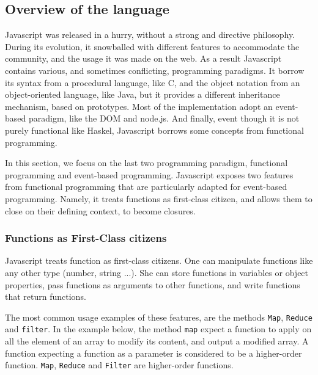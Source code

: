 \subsection{Overview of the language}

Javascript was released in a hurry, without a strong and directive philosophy.
During its evolution, it snowballed with different features to accommodate the community, and the usage it was made on the web. As a result Javascript contains various, and sometimes conflicting, programming paradigms.
It borrow its syntax from a procedural language, like C, and the object notation from an object-oriented language, like Java, but it provides a different inheritance mechanism, based on prototypes. Most of the implementation adopt an event-based paradigm, like the DOM and node.js.
And finally, event though it is not purely functional like Haskel, Javascript borrows some concepts from functional programming.

In this section, we focus on the last two programming paradigm, functional programming and event-based programming.
Javascript exposes two features from functional programming that are particularly adapted for event-based programming.
Namely, it treats functions as first-class citizen, and allows them to close on their defining context, to become closures.

\subsubsection{Functions as First-Class citizens}


Javascript treats function as first-class citizens.
One can manipulate functions like any other type (number, string ...).
She can store functions in variables or object properties, pass functions as arguments to other functions, and write functions that return functions.

The most common usage examples of these features, are the methods \texttt{Map}, \texttt{Reduce} and \texttt{filter}.
In the example below, the method \texttt{map} expect a function to apply on all the element of an array to modify its content, and output a modified array.
A function expecting a function as a parameter is considered to be a higher-order function. \texttt{Map}, \texttt{Reduce} and \texttt{Filter} are higher-order functions.

